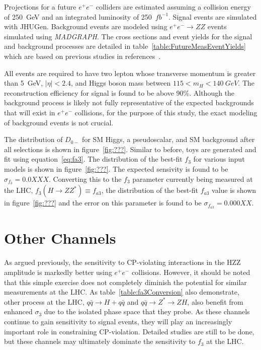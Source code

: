 Projections for a future $e^+e^-$
colliders are estimated assuming a collision energy  
of 250~GeV and an integrated luminosity of 250~$fb^{-1}$.
Signal events are simulated with JHUGen.  Background events
are modeled using $e^+e^-\to ZZ$ events simulated using
{\it MADGRAPH}.  
The cross sections and event yields for the signal and
background processes are detailed in 
table~\ref{table:FutureMeasEventYields}
which are based on previous studies in references~\cite{???}.

All events are required to have two lepton whose 
transverse momentum is greater than 5~GeV, $|\eta|<2.4$, and 
Higgs boson mass between $115<m_H<140~GeV$.  The reconstruction
efficiency for signal is found to be above 90\%. Although
the background process is likely not fully representative
of the expected backgrounds that will exist in $e^+e^-$
collisions, for the purpose of this study, the exact modeling 
of background events is not crucial.  

The distribution of $D_{0-}$ for SM Higgs, a pseudoscalar,
and SM background after all selections is shown in 
figure~\ref{fig:???}.  Similar to before, toys are generated
and fit using equation~\ref{eq:fa3}.  The distribution of
the best-fit $f_3$ for various input models is shown in 
figure~\ref{fig:???}.  The expected sensivity is found to be 
$\sigma_{f_3}=0.0XXX$.  Converting this to the $f_3$ parameter
currently being measured at the LHC, $f_3(H\to ZZ^*)\equiv f_{a3}$, 
the distribution of the best-fit $f_{a3}$ value is shown in 
figure~\ref{fig:???} and the error on this parameter is found
to be $\sigma_{f_{a3}}=0.000XX$.

\section{Other Channels}

As argued previously, the sensitivity to CP-violating 
interactions in the 
HZZ amplitude is markedly better using $e^+e^-$ collisions.  
However, it should be noted that this simple exercise does not
completely diminish the potential for similar measurements at 
the LHC.  As table~\ref{table:fa3Conversion} also demonstrate,
other process at the LHC, $q\bar{q}\to H + q\bar{q}$ and
$q\bar{q}\to Z^* \to ZH$, also benefit from enhanced $\sigma_3$
due to the isolated phase space that they probe.  As these channels 
continue to gain sensitivity to signal events, they will play an
increasingly important role in constraining CP-violation.
Detailed studies are still to be done, but these channels may
ultimately dominate the sensitivity to $f_3$ at the LHC.  

